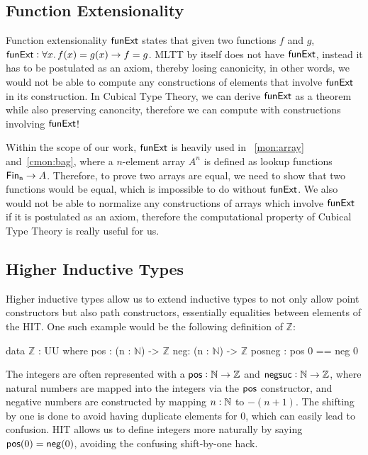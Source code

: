 \subsection{Function Extensionality}
Function extensionality $\operatorname{\mathsf{funExt}}$ states that given two functions $f$ and $g$,
$\operatorname{\mathsf{funExt}}: \forall x.\,f(x) = g(x) \to f = g$. MLTT by itself does not have $\operatorname{\mathsf{funExt}}$,
instead it has to be postulated as an axiom, thereby losing canonicity, in other words,
we would not be able to compute any constructions of elements that involve $\operatorname{\mathsf{funExt}}$
in its construction. In Cubical Type Theory, we can derive $\operatorname{\mathsf{funExt}}$
as a theorem while also preserving canoncity, therefore we can compute with constructions
involving $\operatorname{\mathsf{funExt}}$!

Within the scope of our work, $\operatorname{\mathsf{funExt}}$ is heavily used in
~\cref{mon:array} and~\cref{cmon:bag}, where a $n$-element array $A^n$ is defined as lookup functions
$\Fin[n] \to A$. Therefore, to prove two arrays are equal, we need to show that two functions would be
equal, which is impossible to do without $\operatorname{\mathsf{funExt}}$. We also would not be able to normalize
any constructions of arrays which involve $\operatorname{\mathsf{funExt}}$ if it is postulated as an axiom, therefore
the computational property of Cubical Type Theory is really useful for us.

\subsection{Higher Inductive Types}\label{sec:HIT}
Higher inductive types
allow us to extend inductive types to not only allow point constructors
but also path constructors, essentially equalities between elements of the HIT. One such example
would be the following definition of $\mathbb{Z}$:

\vspace{-1em}
\begin{code}
data $\mathbb{Z}$ : UU where
    pos : (n : $\mathbb{N}$) -> $\mathbb{Z}$
    neg: (n : $\mathbb{N}$) -> $\mathbb{Z}$
    posneg : pos 0 == neg 0
\end{code}
\vspace{1em}

The integers are often represented with a $\operatorname{\mathsf{pos}} : \mathbb{N} \to \mathbb{Z}$
and $\operatorname{\mathsf{negsuc}} : \mathbb{N} \to \mathbb{Z}$, where natural numbers
are mapped into the integers via the $\operatorname{\mathsf{pos}}$ constructor, and negative numbers are constructed
by mapping $n : \mathbb{N}$ to $-(n + 1)$. The shifting by one is done to avoid having duplicate elements
for 0, which can easily lead to confusion. HIT allows us to define integers more naturally by saying
$\operatorname{\mathsf{pos}}(0) = \operatorname{\mathsf{neg}}(0)$, avoiding the confusing shift-by-one hack.

